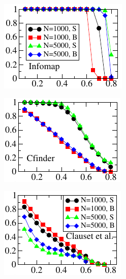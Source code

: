 
\begin{figure}[h!]
    \centering
    \begin{subfigure}{0.35\textwidth}
    \centering
    \includegraphics[width=\otherplotswidth]{lfrpaper/1_split_kropped.pdf}
    \end{subfigure}%
    \begin{subfigure}{0.35\textwidth}
    \centering
    \includegraphics[width=\otherplotswidth]{lfrpaper/2_split_kropped.pdf}
    \end{subfigure}%
    \begin{subfigure}{0.35\textwidth}
    \centering
    \includegraphics[width=\otherplotswidth]{lfrpaper/3_split_kropped.pdf}

\end{subfigure}
\end{figure}
